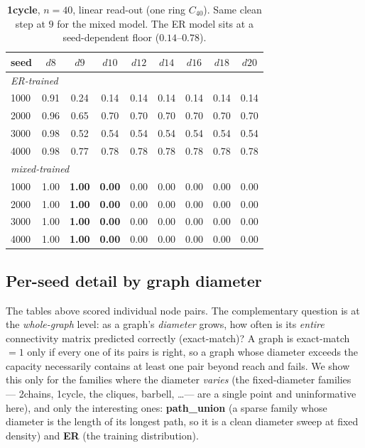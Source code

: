 \documentclass[11pt,a4paper]{article}
\begin{document}
\begin{table}[H]\centering\small
\begin{tabular}{lcccccccc}
\toprule
seed & $d8$ & $d9$ & $d10$ & $d12$ & $d14$ & $d16$ & $d18$ & $d20$ \\
\midrule
\multicolumn{9}{l}{\emph{ER-trained}}\\
1000 & 0.91 & 0.24 & 0.14 & 0.14 & 0.14 & 0.14 & 0.14 & 0.14 \\
2000 & 0.96 & 0.65 & 0.70 & 0.70 & 0.70 & 0.70 & 0.70 & 0.70 \\
3000 & 0.98 & 0.52 & 0.54 & 0.54 & 0.54 & 0.54 & 0.54 & 0.54 \\
4000 & 0.98 & 0.77 & 0.78 & 0.78 & 0.78 & 0.78 & 0.78 & 0.78 \\
\midrule
\multicolumn{9}{l}{\emph{mixed-trained}}\\
1000 & 1.00 & \textbf{1.00} & \textbf{0.00} & 0.00 & 0.00 & 0.00 & 0.00 & 0.00 \\
2000 & 1.00 & \textbf{1.00} & \textbf{0.00} & 0.00 & 0.00 & 0.00 & 0.00 & 0.00 \\
3000 & 1.00 & \textbf{1.00} & \textbf{0.00} & 0.00 & 0.00 & 0.00 & 0.00 & 0.00 \\
4000 & 1.00 & \textbf{1.00} & \textbf{0.00} & 0.00 & 0.00 & 0.00 & 0.00 & 0.00 \\
\bottomrule\end{tabular}
\caption{\textbf{1cycle}, $n=40$, linear read-out (one ring $C_{40}$). Same clean step at $9$ for the mixed model.
The ER model sits at a seed-dependent floor ($0.14$--$0.78$).}
\label{tab:n40_1cycle}
\end{table}

\subsection{Per-seed detail by graph diameter}
\label{sec:bydiam}

The tables above scored individual node pairs. The complementary question is at the
\emph{whole-graph} level: as a graph's \emph{diameter} grows, how often is its \emph{entire}
connectivity matrix predicted correctly (exact-match)? A graph is exact-match $=1$ only if every
one of its pairs is right, so a graph whose diameter exceeds the capacity necessarily contains
at least one pair beyond reach and fails. We show this only for the families where the diameter
\emph{varies} (the fixed-diameter families --- 2chains, 1cycle, the cliques, barbell, \ldots ---
are a single point and uninformative here), and only the interesting ones: \textbf{path\_union}
(a sparse family whose diameter is the length of its longest path, so it is a clean diameter
sweep at fixed density) and \textbf{ER} (the training distribution).
\end{document}
